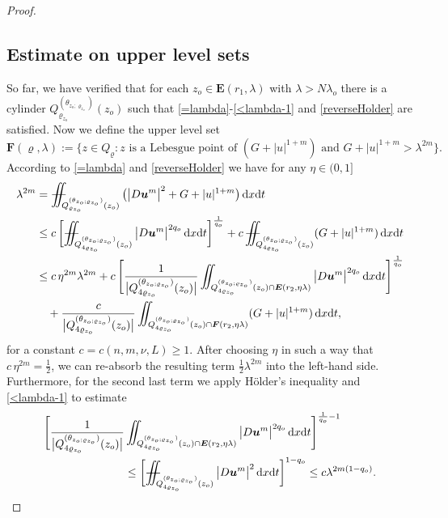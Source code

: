 \documentclass[a4paper, 10pt, american]{amsart}
\numberwithin{theorem}{section}
\numberwithin{equation}{section}
\newcommand{\dxdt}{\,\mathrm{d}x\mathrm{d}t}
\renewcommand{\rho}{\varrho}
\newcommand{\power}[2]{\bm{#1^{\mbox{\unboldmath{\scriptsize$#2$}}}}}
\def\Xiint#1{\mathchoice
    {\XXiint\displaystyle\textstyle{#1}}%
    {\XXiint\textstyle\scriptstyle{#1}}%
    {\XXiint\scriptstyle\scriptscriptstyle{#1}}%
    {\XXiint\scriptscriptstyle\scriptscriptstyle{#1}}%
    \!\iint}
\def\XXiint#1#2#3{\setbox0=\hbox{$#1{#2#3}{\iint}$}
    \vcenter{\hbox{$#2#3$}}\kern-0.5\wd0}
\def\biint{\Xiint{-\!-}}
\begin{document}
\begin{proof}
\subsection{Estimate on upper level sets}
So far, we have verified that for each $z_o\in \boldsymbol E(r_1,\lambda)$ with $\lambda>N\lambda_o$ there is a cylinder $Q_{\rho_{z_o}}^{(\theta_{z_o;\rho_{z_o}})}(z_o)$ such that \eqref{=lambda}-\eqref{<lambda-1} and \eqref{reverseHolder} are satisfied.
Now we define the upper level set  
$$
	\boldsymbol F(\rho,\lambda)
	:=
	\Big\{z\in Q_{\rho}: 
	\mbox{$z$ is a Lebesgue point of $(G+|u|^{1+m})$ and 
	$G+|u|^{1+m}>\lambda^{2m}$}\Big\}.
$$
According to \eqref{=lambda} and \eqref{reverseHolder} we have for any $\eta\in (0,1]$  
\begin{align}\label{est-lambda2m}
\nonumber
	\lambda^{2m}
	&=
	\biint_{Q_{\rho_{z_o}}^{(\theta_{z_o;\rho_{z_o}})}(z_o)} 
	\big(\big|D\power{u}{m}\big|^2 + G+|u|^{1+m}\big) \dxdt \\\nonumber
	&\le
	c\,\bigg[\biint_{Q_{4\rho_{z_o}}^{(\theta_{z_o;\rho_{z_o}})}(z_o)} 
	\big|D\power{u}{m}\big|^{2q_o} \dxdt \bigg]^{\frac{1}{q_o}} +
	c\,  \biint_{Q_{4\rho_{z_o}}^{(\theta_{z_o;\rho_{z_o}})}(z_o)} (G+|u|^{1+m}) \dxdt\\\nonumber
	&\le
	c\,\eta^{2m}\lambda^{2m} +
	c\,\Bigg[\frac{1}{\big|Q_{4\rho_{z_o}}^{(\theta_{z_o;\rho_{z_o}})}(z_o)\big|}
	\iint_{Q_{4\rho_{z_o}}^{(\theta_{z_o;\rho_{z_o}})}(z_o)\cap \boldsymbol E(r_2,\eta\lambda)} 
	\big|D\power{u}{m}\big|^{2q_o} \dxdt \Bigg]^{\frac{1}{q_o}} \\
	&\quad+
	\frac{c}{\big|Q_{4\rho_{z_o}}^{(\theta_{z_o;\rho_{z_o}})}(z_o)\big|}
	\iint_{Q_{4\rho_{z_o}}^{(\theta_{z_o;\rho_{z_o}})}(z_o)\cap \boldsymbol  F(r_2,\eta\lambda)} 
	(G+|u|^{1+m} )\dxdt ,
\end{align}
for a constant  $c=c(n,m,\nu ,L)\ge1$. 
After choosing $\eta$ in such a way that  $c\, \eta^{2m}=\frac{1}{2}$,
we can re-absorb the resulting term $\frac12\lambda^{2m}$ into the left-hand side. Furthermore, for the second last term we apply H\"older's inequality and \eqref{<lambda-1} to estimate 
\begin{align*}
	\Bigg[\frac{1}{\big|Q_{4\rho_{z_o}}^{(\theta_{z_o;\rho_{z_o}})}(z_o)\big|} &
	\iint_{Q_{4\rho_{z_o}}^{(\theta_{z_o;\rho_{z_o}})}(z_o)\cap \boldsymbol E(r_2,\eta\lambda)} 
	\big|D\power{u}{m}\big|^{2q_o} \dxdt \Bigg]^{\frac{1}{q_o}-1} \\
	&\le
	\bigg[\biint_{Q_{4\rho_{z_o}}^{(\theta_{z_o;\rho_{z_o}})}(z_o)} 
	\big|D\power{u}{m}\big|^{2} \dxdt \bigg]^{1-q_o}
	\le
	c\lambda^{2m(1-q_o)}.

\end{align*}
\end{proof}
\end{document}

